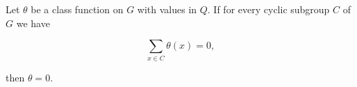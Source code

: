 Let $\theta$ be a class function on $G$ with values in $Q$. If for every cyclic subgroup $C$ of $G$ we have

$$\sum_{x \in C} \theta(x) = 0,$$

then $\theta = 0$.
